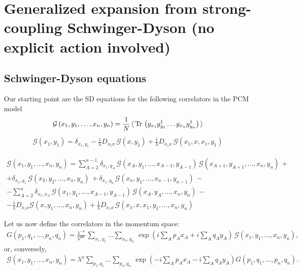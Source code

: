 \documentclass[12pt]{article}
\newcommand{\lr}[1]{ \left( #1 \right) }
\newcommand{\vev}[1]{ \langle \, #1 \, \rangle }
\newcommand{\tr}{ {\rm Tr} \, }
\newcommand{\expa}[1]{ \exp{\left( #1 \right)} }
\newcommand{\G}{\mathcal{G}}
\begin{document}
\section*{Generalized expansion from strong-coupling Schwinger-Dyson (no explicit action involved)}

\subsection*{Schwinger-Dyson equations}

Our starting point are the SD equations for the following correlators in the PCM model
\begin{eqnarray}
\label{gf_def}
\G\lr{x_1, y_1, \ldots, x_n, y_n}
=
\frac{1}{N}\, \vev{ \tr\lr{
g_{x_1} g^{\dag}_{y_1} \ldots g_{x_n} g^{\dag}_{y_n}} }
\end{eqnarray}
\begin{eqnarray}
\label{SDs_n2}
\G\lr{x_1, y_1} =
\delta_{x_1, y_1}
 - %
\frac{1}{\lambda} D_{x_1 x} \, \G\lr{x, y_1}
 +
\frac{1}{\lambda} D_{x_1 x} \, \G\lr{x_1, x, x_1, y_1}
\end{eqnarray}

\begin{eqnarray}
\label{SDs}
\G\lr{x_1, y_1, \ldots, x_n, y_n}
= %
\sum\limits_{A=2}^{n-1} \delta_{x_1, y_A} \,
\G\lr{x_A, y_1, \ldots, x_{A-1}, y_{A-1}}\,
\G\lr{x_{A+1}, y_{A+1}, \ldots, x_n, y_n}\,
+ \nonumber \\ +
\delta_{x_1, y_1} \, \G\lr{x_2, y_2, \ldots, x_n, y_n}\,
+
\delta_{x_1, y_n} \, \G\lr{x_n, y_1, \ldots, x_{n-1}, y_{n-1}}\,
- \nonumber \\ -
\sum\limits_{A=2}^{n} \delta_{x_1, x_A} \,
 \G\lr{x_1, y_1, \ldots, x_{A-1}, y_{A-1}}\,
 \G\lr{x_A, y_A, \ldots, x_n, y_n}\,
- \nonumber \\ -
\frac{1}{\lambda} D_{x_1 x} \G\lr{x, y_1, \ldots, x_n, y_n}
+
\frac{1}{\lambda} D_{x_1 x} \, \G\lr{x_1, x, x_1, y_1, \ldots, x_n, y_n}
\end{eqnarray}

Let us now define the correlators in the momentum space:
\begin{eqnarray}
\label{momentum_space_def}
 G\lr{p_1, q_1, \ldots, p_n, q_n} = \frac{\lambda^{-n}}{V^{2 n}} \,
\sum\limits_{x_1, y_1} \ldots \sum\limits_{x_n, y_n} \,
\expa{i \sum\limits_A p_A x_A + i \sum\limits_A q_A y_A} \,
\G\lr{x_1, y_1, \ldots, x_n, y_n}  ,
\end{eqnarray}
or, conversely,
\begin{eqnarray}
\label{momentum_space_def_inverse}
 \G\lr{x_1, y_1, \ldots, x_n, y_n}
 =
 \lambda^{n}
 \sum\limits_{p_1, q_1} \ldots \sum\limits_{p_n, q_n} \,
 \expa{-i \sum\limits_A p_A x_A - i \sum\limits_A q_A y_A}
  G\lr{p_1, q_1, \ldots, p_n, q_n} .
\end{eqnarray}
\end{document}
